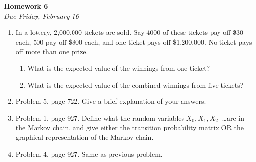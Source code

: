 \documentclass[oneside,12pt]{memoir}
\begin{document}
\begin{center}
\textbf{\large Homework 6} \\
\emph{Due Friday, February 16}
\end{center}

\begin{enumerate}[leftmargin=*]

\item In a lottery, 2,000,000 tickets are sold. Say 4000 of these tickets pay off \$30 each, 500 pay off \$800 each, and one ticket pays off \$1,200,000. No ticket pays off more than one prize.
	\begin{enumerate}
		\item What is the expected value of the winnings from one ticket?
		\item What is the expected value of the combined winnings from five tickets?
	\end{enumerate} 
\item Problem 5, page 722. Give a brief explanation of your answers.
\item Problem 1, page 927. Define what the random variables $X_0, X_1, X_2$, \dots are in the Markov chain, and give either the transition probability matrix OR the graphical representation of the Markov chain.
\item Problem 4, page 927. Same as previous problem.




\end{enumerate}
\end{document}

